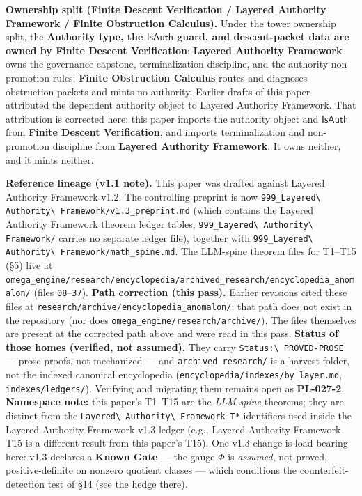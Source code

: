 \documentclass[
  10pt,
]{article}
\DeclareRobustCommand{\texttt}[1]{{\paperSymbolFont\nolinkurl{#1}}}
\begin{document}
\textbf{Ownership split (Finite Descent Verification / Layered Authority Framework / Finite Obstruction Calculus).} Under the tower ownership split, the \textbf{Authority type, the \protect\hypertarget{math-E0004-0004}{}{\(\mathsf{IsAuth}\)} guard, and descent-packet data are owned by Finite Descent Verification}; \textbf{Layered Authority Framework} owns the governance capstone, terminalization discipline, and the authority non-promotion rules; \textbf{Finite Obstruction Calculus} routes and diagnoses obstruction packets and mints no authority. Earlier drafts of this paper attributed the dependent authority object to Layered Authority Framework. That attribution is corrected here: this paper imports the authority object and \protect\hypertarget{math-E0004-0005}{}{\(\mathsf{IsAuth}\)} from \textbf{Finite Descent Verification}, and imports terminalization and non-promotion discipline from \textbf{Layered Authority Framework}. It owns neither, and it mints neither.

\textbf{Reference lineage (v1.1 note).} This paper was drafted against Layered Authority Framework v1.2. The controlling preprint is now \texttt{999\_Layered\ Authority\ Framework/v1.3\_preprint.md} (which contains the Layered Authority Framework theorem ledger tables; \texttt{999\_Layered\ Authority\ Framework/} carries no separate ledger file), together with \texttt{999\_Layered\ Authority\ Framework/math\_spine.md}. The LLM-spine theorem files for T1--T15 (§5) live at \texttt{omega\_engine/research/encyclopedia/archived\_research/encyclopedia\_anomalon/} (files \texttt{08}--\texttt{37}). \textbf{Path correction (this pass).} Earlier revisions cited these files at \texttt{research/archive/encyclopedia\_anomalon/}; that path does not exist in the repository (nor does \texttt{omega\_engine/research/archive/}). The files themselves are present at the corrected path above and were read in this pass. \textbf{Status of those homes (verified, not assumed).} They carry \texttt{Status:\ PROVED-PROSE} --- prose proofs, not mechanized --- and \texttt{archived\_research/} is a harvest folder, not the indexed canonical encyclopedia (\texttt{encyclopedia/indexes/by\_layer.md}, \texttt{indexes/ledgers/}). Verifying and migrating them remains open as \textbf{PL-027-2}. \textbf{Namespace note:} this paper's T1--T15 are the \emph{LLM-spine} theorems; they are distinct from the \texttt{Layered\ Authority\ Framework-T*} identifiers used inside the Layered Authority Framework v1.3 ledger (e.g., Layered Authority Framework-T15 is a different result from this paper's T15). One v1.3 change is load-bearing here: v1.3 declares a \textbf{Known Gate} --- the gauge \protect\hypertarget{math-E0005-0006}{}{\(\Phi\)} is \emph{assumed}, not proved, positive-definite on nonzero quotient classes --- which conditions the counterfeit-detection test of §14 (see the hedge there).
\end{document}
